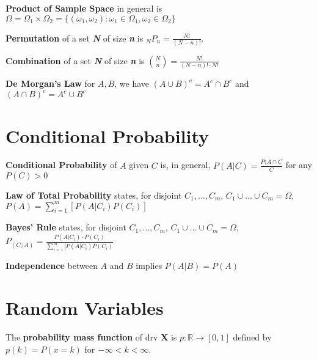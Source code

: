 \documentclass[5pt]{article}
\begin{document}
\begin{definition}
\textbf{Product of Sample Space} in general is $\Omega = \Omega_1 \times \Omega_2 = \{(\omega_1, \omega_2): \omega_1 \in \Omega_1, \omega_2 \in \Omega_2\}$
\end{definition}

\begin{definition}
\textbf{Permutation} of a set \textbf{\emph{N}} of size \textbf{\emph{n}} is $_NP_n = \frac{N!}{(N-n)!}$.
\end{definition}

\begin{definition}
\textbf{Combination} of a set \textbf{\emph{N}} of size \textbf{\emph{n}} is ${N \choose n} = \frac{N!}{(N-n)! \cdot N!}$
\end{definition}

\begin{definition}
\textbf{De Morgan's Law} for $A, B$, we have $(A\cup B)^c = A^c \cap B^c$ and $(A\cap B)^c = A^c \cup B^c$
\end{definition}


\section{Conditional Probability}
\begin{definition}
\textbf{Conditional Probability} of $A$ given $C$ is, in general, $P(A|C) = \frac{P(A\cap C}{C}$ for any $P(C)>0$
\end{definition}

\begin{definition}
\textbf{Law of Total Probability} states, for disjoint $C_1,\dots,C_m$, $C_1 \cup \dots \cup C_m = \Omega$, $P(A) = \sum^m_{i=1} [P(A|C_i)P(C_i)]$
\end{definition}

\begin{definition}
\textbf{Bayes' Rule} states, for disjoint $C_1,\dots,C_m$, $C_1 \cup \dots \cup C_m=\Omega$, $P_(C_i|A) = \frac{P(A|C_i)\cdot P(C_i)}{\sum^m_{i=1}[P(A|C_i)P(C_i)}$
\end{definition}

\begin{definition}
\textbf{Independence} between $A$ and $B$ implies $P(A|B) = P(A)$
\end{definition} 
\section{Random Variables}
\begin{definition}
The \textbf{probability mass function} of drv \textbf{X} is $p: \mathbb{R} \to [0,1]$ defined by $p(k) = P(x=k)$ for $-\infty < k < \infty$.
\end{definition}
\end{document}
